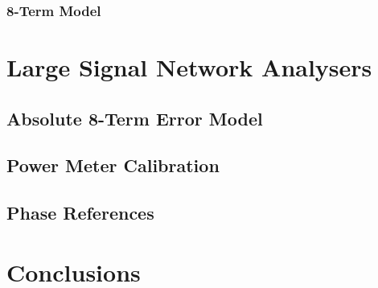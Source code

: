 \documentclass[../thesis/thesis.tex]{subfiles}
\begin{document}
\begin{refsection}
\subsubsection{8-Term Model}

\section{Large Signal Network Analysers}
\subsection{Absolute 8-Term Error Model}
\subsection{Power Meter Calibration}
\subsection{Phase References}
\section{Conclusions}
\printbibliography
\end{refsection}
\end{document}
